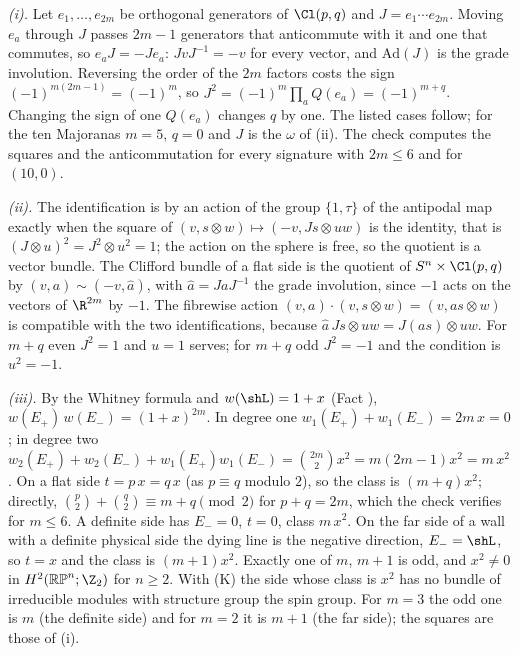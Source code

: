 \emph{(i).} Let $e_{1}, \dots, e_{2m}$ be orthogonal generators of $\Cl(p,q)$ and $J = e_{1}\cdots e_{2m}$. Moving $e_{a}$ through $J$ passes $2m - 1$ generators that anticommute with it and one that commutes, so $e_{a}J = -Je_{a}$: $JvJ^{-1} = -v$ for every vector, and $\mathrm{Ad}(J)$ is the grade involution. Reversing the order of the $2m$ factors costs the sign $(-1)^{m(2m-1)} = (-1)^{m}$, so $J^{2} = (-1)^{m}\prod_{a}Q(e_{a}) = (-1)^{m+q}$. Changing the sign of one $Q(e_{a})$ changes $q$ by one. The listed cases follow; for the ten Majoranas $m = 5$, $q = 0$ and $J$ is the $\omega$ of (ii). The check computes the squares and the anticommutation for every signature with $2m \leq 6$ and for $(10,0)$.

\emph{(ii).} The identification is by an action of the group $\{1, \tau\}$ of the antipodal map exactly when the square of $(v, s \otimes w) \mapsto (-v, Js \otimes uw)$ is the identity, that is $(J \otimes u)^{2} = J^{2} \otimes u^{2} = 1$; the action on the sphere is free, so the quotient is a vector bundle. The Clifford bundle of a flat side is the quotient of $S^{n} \times \Cl(p,q)$ by $(v, a) \sim (-v, \hat{a})$, with $\hat{a} = JaJ^{-1}$ the grade involution, since $-1$ acts on the vectors of $\R^{2m}$ by $-1$. The fibrewise action $(v, a)\cdot(v, s \otimes w) = (v, as \otimes w)$ is compatible with the two identifications, because $\hat{a}\,Js \otimes uw = J(as) \otimes uw$. For $m + q$ even $J^{2} = 1$ and $u = 1$ serves; for $m + q$ odd $J^{2} = -1$ and the condition is $u^{2} = -1$.

\emph{(iii).} By the Whitney formula and $w(\shL) = 1 + x$ (Fact ), $w(E_{+})\,w(E_{-}) = (1 + x)^{2m}$. In degree one $w_{1}(E_{+}) + w_{1}(E_{-}) = 2m\,x = 0$; in degree two $w_{2}(E_{+}) + w_{2}(E_{-}) + w_{1}(E_{+})w_{1}(E_{-}) = \binom{2m}{2}x^{2} = m(2m - 1)x^{2} = m\,x^{2}$. On a flat side $t = p\,x = q\,x$ (as $p \equiv q$ modulo $2$), so the class is $(m + q)x^{2}$; directly, $\binom{p}{2} + \binom{q}{2} \equiv m + q \pmod 2$ for $p + q = 2m$, which the check verifies for $m \leq 6$. A definite side has $E_{-} = 0$, $t = 0$, class $m\,x^{2}$. On the far side of a wall with a definite physical side the dying line is the negative direction, $E_{-} = \shL$, so $t = x$ and the class is $(m + 1)x^{2}$. Exactly one of $m$, $m + 1$ is odd, and $x^{2} \neq 0$ in $H^{2}(\mathbb{RP}^{n}; \Z_{2})$ for $n \geq 2$. With (K) the side whose class is $x^{2}$ has no bundle of irreducible modules with structure group the spin group. For $m = 3$ the odd one is $m$ (the definite side) and for $m = 2$ it is $m + 1$ (the far side); the squares are those of (i).

